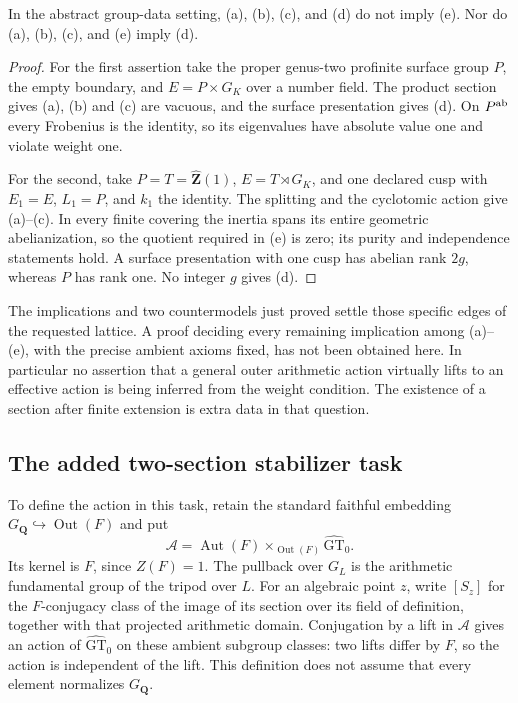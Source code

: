 \begin{proposition}
\label{A:condition-countermodels}
In the abstract group-data setting, (a), (b), (c),
and (d) do not imply (e).  Nor do (a), (b), (c), and
(e) imply (d).
\end{proposition}
\begin{proof}
For the first assertion take the proper genus-two
profinite surface group $P$, the empty boundary,
and $E=P\times G_K$ over a number field.  The product
section gives (a), (b) and (c) are vacuous, and the
surface presentation gives (d).  On $P^{\rm ab}$
every Frobenius is the identity, so its eigenvalues
have absolute value one and violate weight one.

For the second, take $P=T=\widehat{\mathbf Z}(1)$,
$E=T\rtimes G_K$, and one declared cusp with
$E_1=E$, $L_1=P$, and $k_1$ the identity.  The
splitting and the cyclotomic action give (a)--(c).
In every finite covering the inertia spans its entire
geometric abelianization, so the quotient required
in (e) is zero; its purity and independence statements
hold.  A surface presentation with one cusp has
abelian rank $2g$, whereas $P$ has rank one.  No
integer $g$ gives (d).
\end{proof}

\begin{remark}
\label{A:condition-lattice-open}
The implications and two countermodels just proved
settle those specific edges of the requested lattice.
A proof deciding every remaining implication among
(a)--(e), with the precise ambient axioms fixed, has
not been obtained here.  In particular no assertion
that a general outer arithmetic action virtually lifts
to an effective action is being inferred from the
weight condition.  The existence of a section after
finite extension is extra data in that question.
\end{remark}

\subsection{The added two-section stabilizer task}

To define the action in this task, retain the standard faithful
embedding $G_{\mathbf Q}\hookrightarrow\operatorname{Out}(F)$
and put
\[
 \mathcal A=\operatorname{Aut}(F)
       \mathop{\times}_{\operatorname{Out}(F)}
                   \widehat{\mathrm{GT}}_0.
\]
Its kernel is $F$, since $Z(F)=1$.  The pullback over
$G_L$ is the arithmetic fundamental group of the
tripod over $L$.  For an algebraic point $z$, write
$[S_z]$ for the $F$-conjugacy class of the image of
its section over its field of definition, together
with that projected arithmetic domain.  Conjugation
by a lift in $\mathcal A$ gives an action of
$\widehat{\mathrm{GT}}_0$ on these ambient subgroup
classes: two lifts differ by $F$, so the action is
independent of the lift.  This definition does not
assume that every element normalizes $G_{\mathbf Q}$.

